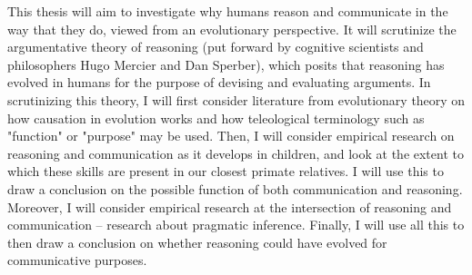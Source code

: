 \documentclass{article}
\begin{document}
\noindent This thesis will aim to investigate why humans reason and communicate in the way that they do, viewed from an evolutionary perspective. It will scrutinize the argumentative theory of reasoning (put forward by cognitive scientists and philosophers Hugo Mercier and Dan Sperber), which posits that reasoning has evolved in humans for the purpose of devising and evaluating arguments. In scrutinizing this theory, I will first consider literature from evolutionary theory on how causation in evolution works and how teleological terminology such as "function" or "purpose" may be used. Then, I will consider empirical research on reasoning and communication as it develops in children, and look at the extent to which these skills are present in our closest primate relatives. I will use this to draw a conclusion on the possible function of both communication and reasoning. Moreover, I will consider empirical research at the intersection of reasoning and communication -- research about pragmatic inference.
Finally, I will use all this to then draw a conclusion on whether reasoning could have evolved for communicative purposes.
\end{document}
